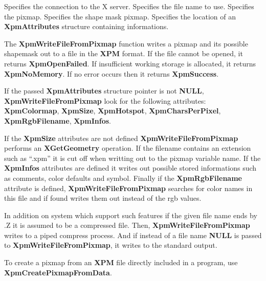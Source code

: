 \begin{description}

 Specifies the connection to the X server.
 Specifies the file name to use.
 Specifies the pixmap.
 Specifies the shape mask pixmap.
 Specifies the location of an {\bf XpmAttributes} structure
containing informations.

\end{description} 

The {\bf XpmWriteFileFromPixmap} function writes a pixmap and its possible
shapemask out to a file in the {\bf XPM} format. If the file cannot be opened,
it returns {\bf XpmOpenFailed}. If insufficient working storage is
allocated, it returns {\bf XpmNoMemory}. If no error occurs then it
returns {\bf XpmSuccess}.

If the passed {\bf XpmAttributes} structure pointer is not {\bf NULL}, {\bf
XpmWriteFileFromPixmap} look for the following attributes: {\bf XpmColormap},
{\bf XpmSize}, {\bf XpmHotspot}, {\bf XpmCharsPerPixel}, {\bf XpmRgbFilename},
{\bf Xpm\-Infos}.

If the {\bf XpmSize} attributes are not defined {\bf XpmWriteFileFromPixmap}
performs an {\bf XGetGeometry} operation. If the filename contains an
extension such as ``.xpm'' it is cut off when writting out to the pixmap
variable name. If the {\bf XpmInfos} attributes are defined it writes out
possible stored informations such as comments, color defaults and symbol.
Finally if the {\bf XpmRgbFilename} attribute is defined, {\bf
XpmWriteFileFromPixmap} searches for color names in this file and if found
writes them out instead of the rgb values.

In addition on system which support such features if the given file name ends
by .Z it is assumed to be a compressed file. Then, {\bf XpmWriteFileFromPixmap}
writes to a piped compress process. And if instead of a file name {\bf NULL}
is passed to {\bf XpmWriteFileFromPixmap}, it writes to the standard output.

\vspace{.5cm}
To create a pixmap from an {\bf XPM} file directly included in a program, use
{\bf XpmCreatePixmapFromData}.

